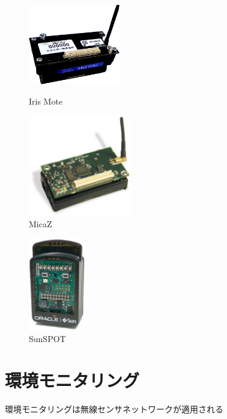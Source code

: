 \begin{figure}[htbp]
 \begin{minipage}{0.5\hsize} \begin{center}
     \includegraphics[width=40mm]{./images/iris_mote.eps}
    \end{center}
    \caption{Iris Mote}
    \label{fig:iris_mote}
 \end{minipage}
 \begin{minipage}{0.5\hsize}
    \begin{center}
     \includegraphics[width=45mm]{./images/micaz.eps}
    \end{center}
    \caption{MicaZ}
    \label{fig:micaz}
 \end{minipage}
\end{figure}

\begin{figure}[htbp]
 \begin{center}
  \includegraphics[width=25mm]{./images/sunspot.eps}
 \end{center}
 \caption{SunSPOT}
 \label{fig:sunspot}
\end{figure}





\section{環境モニタリング}
環境モニタリングは無線センサネットワークが適用される


